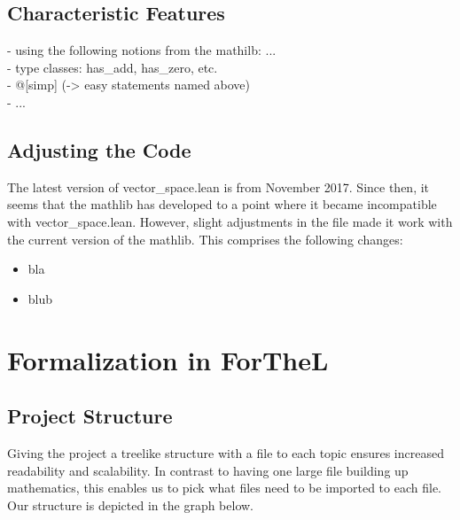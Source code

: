 \documentclass[11pt]{article}
\begin{document}
\subsection{Characteristic Features}
- using the following notions from the mathilb: ... \\
- type classes: has\_add, has\_zero, etc. \\
- @[simp] (-> easy statements named above)\\
- ...

\subsection{Adjusting the Code}
The latest version of vector\_space.lean is from November 2017. Since then, it seems that the mathlib has developed to a point where it became incompatible with vector\_space.lean.
However, slight adjustments in the file made it work with the current version of the mathlib. This comprises the following changes:
\begin{itemize}
\item bla
\item blub
\end{itemize}

\newpage

\section{Formalization in ForTheL}
\subsection{Project Structure}
Giving the project a treelike structure with a file to each topic ensures increased readability and scalability. 
In contrast to having one large file building up mathematics, this enables us to pick what files need to be imported to each file. 
Our structure is depicted in the graph below.
\end{document}
